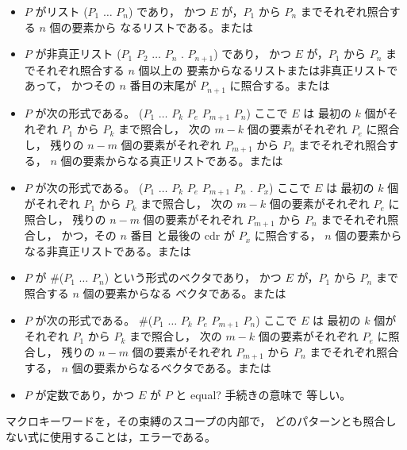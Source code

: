 \begin{entry}
\begin{itemize}
\item $P$ がリスト {\cf ($P_1$ $\dots$ $P_n$)} であり，
      かつ $E$ が，$P_1$ から $P_n$ までそれぞれ照合する $n$ 個の要素から
      なるリストである。または

\item $P$ が非真正リスト {\cf ($P_1$ $P_2$ $\dots$ $P_n$ . $P_{n+1}$)} であり，
      かつ $E$ が，$P_1$ から $P_n$ までそれぞれ照合する $n$ 個以上の
      要素からなるリストまたは非真正リストであって，
      かつその $n$ 番目の末尾が $P_{n+1}$ に照合する。または

\item $P$ が次の形式である。
      {\cf ($P_1$ $\dots$ $P_k$ $P_e$  $P_{m+1}$ \dotsfoo{} $P_n$)}
      ここで $E$ は
      最初の $k$ 個がそれぞれ $P_1$ から $P_k$ まで照合し，
      次の $m-k$ 個の要素がそれぞれ $P_e$ に照合し，
      残りの $n-m$ 個の要素がそれぞれ $P_{m+1}$ から $P_n$ までそれぞれ照合する，
      $n$ 個の要素からなる真正リストである。または

\item $P$ が次の形式である。
      {\cf ($P_1$ $\dots$ $P_k$ $P_{e}$  $P_{m+1}$ \dotsfoo{} $P_n$ . $P_x$)}
      ここで $E$ は
      最初の $k$ 個がそれぞれ $P_1$ から $P_k$ まで照合し，
      次の $m-k$ 個の要素がそれぞれ $P_e$ に照合し，
      残りの $n-m$ 個の要素がそれぞれ $P_{m+1}$ から $P_n$ までそれぞれ照合し，
      かつ，その $n$ 番目 と最後の cdr が $P_x$ に照合する，
      $n$ 個の要素からなる非真正リストである。または

\item $P$ が {\cf \#($P_1$ $\dots$ $P_n$)} という形式のベクタであり，
      かつ $E$ が，$P_1$ から $P_n$ まで照合する $n$ 個の要素からなる
      ベクタである。または

\item $P$ が次の形式である。
      {\cf \#($P_1$ $\dots$ $P_k$ $P_{e}$  $P_{m+1}$ \dotsfoo $P_n$)}
      ここで  $E$ は
      最初の $k$ 個がそれぞれ $P_1$ から $P_k$ まで照合し，
      次の $m-k$ 個の要素がそれぞれ $P_e$ に照合し，
      残りの $n-m$ 個の要素がそれぞれ $P_{m+1}$ から $P_n$ までそれぞれ照合する，
      $n$ 個の要素からなるベクタである。または

\item $P$ が定数であり，かつ $E$ が $P$ と {\cf equal?} 手続きの意味で
      等しい。
\end{itemize}

マクロキーワードを，その束縛のスコープの内部で，
どのパターンとも照合しない式に使用することは，エラーである。


\end{entry}
